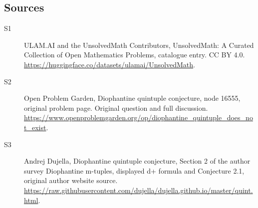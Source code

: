 \documentclass[11pt]{article}
\begin{document}
\subsection{Sources}
\begin{description}
\item[\hypertarget{source:statement:1}{S1}] ULAM.AI and the UnsolvedMath Contributors, UnsolvedMath: A Curated Collection of Open Mathematics Problems, catalogue entry. CC BY 4.0. \url{https://huggingface.co/datasets/ulamai/UnsolvedMath}.
\item[\hypertarget{source:statement:2}{S2}] Open Problem Garden, Diophantine quintuple conjecture, node 16555, original problem page. Original question and full discussion. \url{https://www.openproblemgarden.org/op/diophantine_quintuple_does_not_exist}.
\item[\hypertarget{source:statement:3}{S3}] Andrej Dujella, Diophantine quintuple conjecture, Section 2 of the author survey Diophantine m-tuples, displayed d+ formula and Conjecture 2.1, original author website source. \url{https://raw.githubusercontent.com/dujella/dujella.github.io/master/quint.html}.
\end{description}
\label{end:statement}
\end{document}
